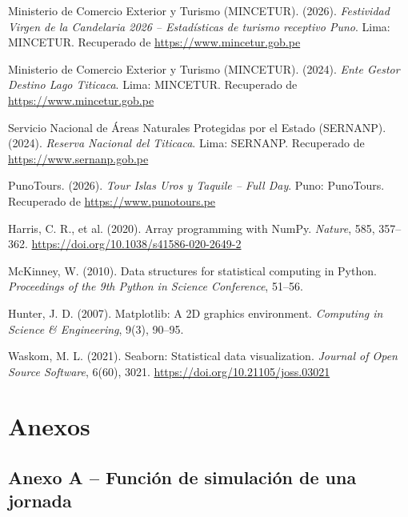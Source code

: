 \documentclass[12pt,a4paper]{article}
\begin{document}
\begin{enumerate}[label={[\arabic*]}, noitemsep]
  \item Ministerio de Comercio Exterior y Turismo (MINCETUR). (2026).
    \textit{Festividad Virgen de la Candelaria 2026 -- Estadísticas de
    turismo receptivo Puno}. Lima: MINCETUR. Recuperado de
    \url{https://www.mincetur.gob.pe}

  \item Ministerio de Comercio Exterior y Turismo (MINCETUR). (2024).
    \textit{Ente Gestor Destino Lago Titicaca}. Lima: MINCETUR. Recuperado
    de \url{https://www.mincetur.gob.pe}

  \item Servicio Nacional de Áreas Naturales Protegidas por el Estado
    (SERNANP). (2024). \textit{Reserva Nacional del Titicaca}. Lima:
    SERNANP. Recuperado de \url{https://www.sernanp.gob.pe}

  \item PunoTours. (2026). \textit{Tour Islas Uros y Taquile -- Full Day}.
    Puno: PunoTours. Recuperado de \url{https://www.punotours.pe}

  \item Harris, C. R., et al. (2020). Array programming with NumPy.
    \textit{Nature}, 585, 357--362.
    \url{https://doi.org/10.1038/s41586-020-2649-2}

  \item McKinney, W. (2010). Data structures for statistical computing in
    Python. \textit{Proceedings of the 9th Python in Science Conference},
    51--56.

  \item Hunter, J. D. (2007). Matplotlib: A 2D graphics environment.
    \textit{Computing in Science \& Engineering}, 9(3), 90--95.

  \item Waskom, M. L. (2021). Seaborn: Statistical data visualization.
    \textit{Journal of Open Source Software}, 6(60), 3021.
    \url{https://doi.org/10.21105/joss.03021}
\end{enumerate}

\section{Anexos}

\subsection{Anexo A -- Función de simulación de una jornada}
\end{document}
